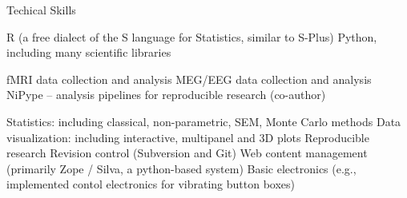 \begin{rubric}{Techical Skills}

\entry* R (a free dialect of the S language for Statistics, similar to S-Plus)
\entry* Python, including many scientific libraries

\entry* fMRI data collection and analysis
\entry* MEG/EEG data collection and analysis
\entry* NiPype -- analysis pipelines for reproducible research (co-author)

\entry* Statistics: including classical, non-parametric, SEM, Monte Carlo methods
\entry* Data visualization: including interactive, multipanel and 3D plots
\entry* Reproducible research
\entry* Revision control (Subversion and Git)
\entry* Web content management (primarily Zope / Silva, a python-based system)
\entry* Basic electronics (e.g., implemented contol electronics for vibrating button
boxes)

\end{rubric}

